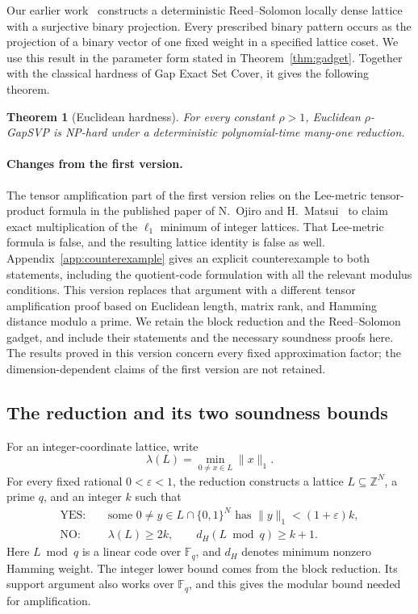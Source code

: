 \documentclass[11pt,letterpaper]{article}
\numberwithin{equation}{section}
\newtheorem{theorem}{Theorem}[section]
\theoremstyle{definition}
\theoremstyle{remark}
\newcommand{\Z}{\mathbb Z}
\newcommand{\F}{\mathbb F}
\newcommand{\YES}{\mathrm{YES}}
\newcommand{\NO}{\mathrm{NO}}
\begin{document}
Our earlier work~\cite{wan} constructs a deterministic Reed--Solomon locally dense lattice with a surjective binary projection. Every prescribed binary pattern occurs as the projection of a binary vector of one fixed weight in a specified lattice coset. We use this result in the parameter form stated in Theorem~\ref{thm:gadget}. Together with the classical hardness of Gap Exact Set Cover, it gives the following theorem.

\begin{theorem}[Euclidean hardness]\label{thm:main}
For every constant $\rho>1$, Euclidean $\rho$-GapSVP is NP-hard under a deterministic polynomial-time many-one reduction.
\end{theorem}

\paragraph{Changes from the first version.}
The tensor amplification part of the first version relies on the Lee-metric tensor-product formula in the published paper of N.~Ojiro and H.~Matsui~\cite{om} to claim exact multiplication of the $\ell_1$ minimum of integer lattices. That Lee-metric formula is false, and the resulting lattice identity is false as well. Appendix~\ref{app:counterexample} gives an explicit counterexample to both statements, including the quotient-code formulation with all the relevant modulus conditions. This version replaces that argument with a different tensor amplification proof based on Euclidean length, matrix rank, and Hamming distance modulo a prime. We retain the block reduction and the Reed--Solomon gadget, and include their statements and the necessary soundness proofs here. The results proved in this version concern every fixed approximation factor; the dimension-dependent claims of the first version are not retained.

\subsection{The reduction and its two soundness bounds}
For an integer-coordinate lattice, write
\[
 \lambda(L)=\min_{0\ne x\in L}\|x\|_1.
\]
For every fixed rational $0<\varepsilon<1$, the reduction constructs a lattice $L\subseteq\Z^N$, a prime $q$, and an integer $k$ such that
\begin{equation}\label{eq:intro-gap}
\begin{aligned}
 \YES:&\quad \text{some }0\ne y\in L\cap\{0,1\}^N
                   \text{ has }\|y\|_1<(1+\varepsilon)k,\\
 \NO:&\quad \lambda(L)\ge2k,\qquad d_H(L\bmod q)\ge k+1.
\end{aligned}
\end{equation}
Here $L\bmod q$ is a linear code over $\F_q$, and $d_H$ denotes minimum nonzero Hamming weight. The integer lower bound comes from the block reduction. Its support argument also works over $\F_q$, and this gives the modular bound needed for amplification.
\end{document}
